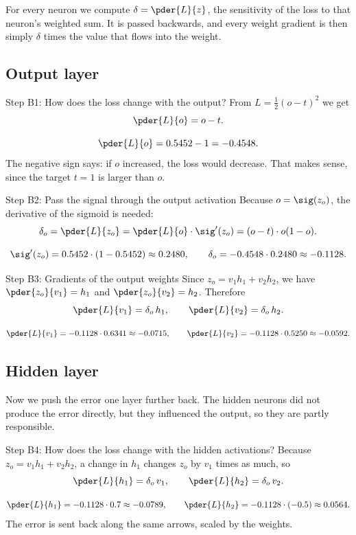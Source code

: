 \begin{keyidea}
For every neuron we compute $\delta=\pder{L}{z}$, the sensitivity of the loss to that neuron's weighted sum. It is passed backwards, and every weight gradient is then simply $\delta$ times the value that flows into the weight.
\end{keyidea}

\subsection*{Output layer}

\begin{stepbox}{Step B1: How does the loss change with the output?}
From $L=\tfrac12(o-t)^2$ we get
\[
\pder{L}{o}=o-t.
\]
\end{stepbox}
\[
\pder{L}{o}=0.5452-1=-0.4548.
\]
The negative sign says: if $o$ increased, the loss would decrease. That makes sense, since the target $t=1$ is larger than $o$.

\begin{stepbox}{Step B2: Pass the signal through the output activation}
Because $o=\sig(z_o)$, the derivative of the sigmoid is needed:
\[
\delta_o=\pder{L}{z_o}=\pder{L}{o}\cdot\sig'(z_o)=(o-t)\cdot o(1-o).
\]
\end{stepbox}
\[
\sig'(z_o)=0.5452\cdot(1-0.5452)\approx0.2480,\qquad
\delta_o=-0.4548\cdot0.2480\approx-0.1128.
\]

\begin{stepbox}{Step B3: Gradients of the output weights}
Since $z_o=v_1h_1+v_2h_2$, we have $\pder{z_o}{v_1}=h_1$ and $\pder{z_o}{v_2}=h_2$. Therefore
\[
\pder{L}{v_1}=\delta_o\,h_1,\qquad \pder{L}{v_2}=\delta_o\,h_2.
\]
\end{stepbox}
\[
\pder{L}{v_1}=-0.1128\cdot0.6341\approx-0.0715,\qquad
\pder{L}{v_2}=-0.1128\cdot0.5250\approx-0.0592.
\]

\subsection*{Hidden layer}
Now we push the error one layer further back. The hidden neurons did not produce the error directly, but they influenced the output, so they are partly responsible.

\begin{stepbox}{Step B4: How does the loss change with the hidden activations?}
Because $z_o=v_1h_1+v_2h_2$, a change in $h_1$ changes $z_o$ by $v_1$ times as much, so
\[
\pder{L}{h_1}=\delta_o\,v_1,\qquad \pder{L}{h_2}=\delta_o\,v_2.
\]
\end{stepbox}
\[
\pder{L}{h_1}=-0.1128\cdot0.7\approx-0.0789,\qquad
\pder{L}{h_2}=-0.1128\cdot(-0.5)\approx0.0564.
\]
The error is sent back along the same arrows, scaled by the weights.

